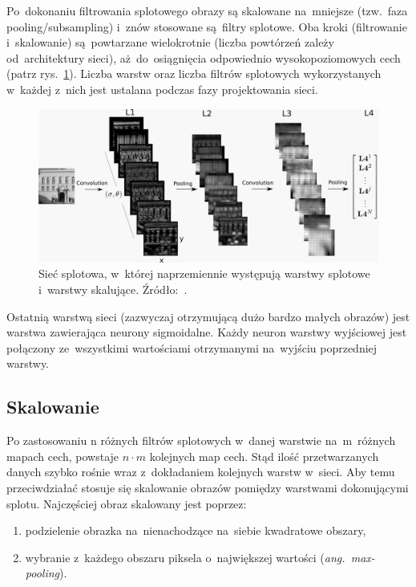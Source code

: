 Po~dokonaniu filtrowania splotowego obrazy są skalowane na~mniejsze (tzw.~faza pooling/subsampling) i~znów
stosowane są~filtry splotowe. Oba kroki (filtrowanie i~skalowanie) są~powtarzane wielokrotnie
(liczba powtórzeń zależy od~architektury sieci), aż~do~osiągnięcia odpowiednio wysokopoziomowych cech (patrz
rys.~\ref{rys:convnet-illustration}). Liczba warstw oraz liczba filtrów splotowych wykorzystanych w~każdej z~nich jest
ustalana podczas fazy projektowania sieci.

\begin{figure}[H]
	\centering
	\includegraphics[width=\linewidth]{img/convnet.png}
	\caption{Sieć splotowa, w~której naprzemiennie występują warstwy splotowe i~warstwy skalujące.
	Źródło:~\cite{convnet-illustration}.}
	\label{rys:convnet-illustration}
\end{figure}

Ostatnią warstwą sieci (zazwyczaj otrzymującą dużo bardzo małych obrazów) jest warstwa zawierająca neurony
sigmoidalne. Każdy neuron warstwy wyjściowej jest połączony ze~wszystkimi wartościami otrzymanymi na~wyjściu
poprzedniej warstwy.

\subsection{Skalowanie}
Po zastosowaniu n różnych filtrów splotowych w~danej warstwie na~m~różnych mapach cech, powstaje $n\cdot m$
kolejnych map cech. Stąd ilość przetwarzanych danych szybko rośnie wraz z~dokładaniem kolejnych warstw
w~sieci. Aby temu przeciwdziałać stosuje się skalowanie obrazów pomiędzy warstwami dokonującymi splotu.
Najczęściej obraz skalowany jest poprzez:
\begin{enumerate}
  \item podzielenie obrazka na~nienachodzące na~siebie kwadratowe obszary,
  \item wybranie z~każdego obszaru piksela o~największej wartości (\textit{ang.~max-pooling}).
\end{enumerate}

